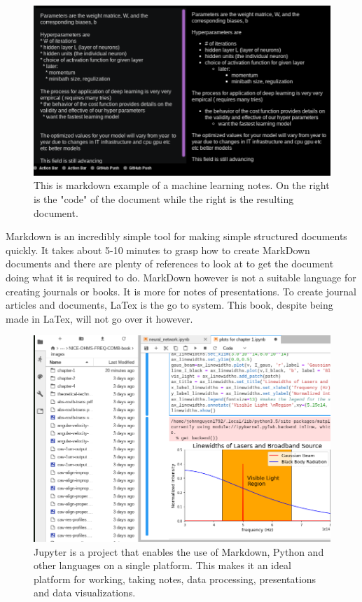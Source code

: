 \documentclass[11pt,a4paper]{book}
\begin{document}
		\begin{figure} [!ht]
			\centering
			\def\svgwidth{\columnwidth}
			\Huge
			\includegraphics[scale=0.45]{images/chapter-1/markdown_of_machine_learning}
			\caption{This is markdown example of a machine learning notes. On the right is the "code" of the document while the right is the resulting document.}
			\label{fig:markdown_of_machine_learning}
		\end{figure}		
		
		Markdown is an incredibly simple tool for making simple structured documents quickly. It takes about 5-10 minutes to grasp how to create MarkDown documents and there are plenty of references to look at to get the document doing what it is required to do. MarkDown however is not a suitable language for creating journals or books. It is more for notes of presentations. To create journal articles and documents, LaTex is the go to system. This book, despite being made in LaTex, will not go over it however.
		
		\begin{figure} [!ht]
			\centering
			\def\svgwidth{\columnwidth}
			\Huge
			\includegraphics[scale=0.45]{images/chapter-1/jupter_image_plot_program}
			\caption{Jupyter is a project that enables the use of Markdown, Python and other languages on a single platform. This makes it an ideal platform for working, taking notes, data processing, presentations and data visualizations.}
			\label{fig:jupter_image_plot_program}
		\end{figure}
	
\end{document}
